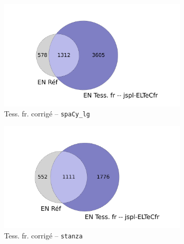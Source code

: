 \begin{figure}[h!]
\begin{minipage}{7cm}
\begin{subfigure}{1\textwidth}
  \includegraphics[width=1\textwidth]{IMAGES/INTERSECTIONS_GLOBALES/ELTeCFRA_Tess. fr -- jspl-ELTeCfr_spacy-lg-concat_intersection.png} 
  \caption{Tess. fr. corrigé -- \texttt{spaCy\_lg}}
  \label{fig:ELTeCFRA_Tess. fr -- jspl-ELTeCfr_spacy-lg-concat_intersection}
  \end{subfigure}
  \end{minipage}
  \begin{minipage}{7cm}
  \begin{subfigure}{1\textwidth}
  \includegraphics[width=1\textwidth]{IMAGES/INTERSECTIONS_GLOBALES/ELTeCFRA_Tess. fr -- jspl-ELTeCfr_stanza-concat_intersection.png}
  \caption{Tess. fr. corrigé -- \texttt{stanza}}
  \label{fig:ELTeCFRA_Tess. fr -- jspl-ELTeCfr_stanza-concat_intersection}
  \end{subfigure}
    \end{minipage}
\begin{minipage}{7cm}
  \begin{subfigure}{1\textwidth}

\end{subfigure}
\end{minipage}
\end{figure}
